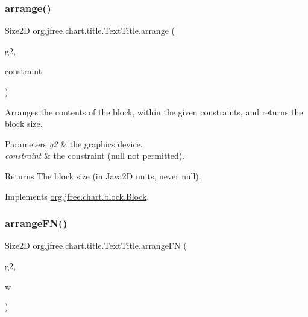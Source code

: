 \subsubsection{\texorpdfstring{arrange()}{arrange()}}
{\footnotesize\ttfamily Size2D org.\+jfree.\+chart.\+title.\+Text\+Title.\+arrange (\begin{DoxyParamCaption}\item[{Graphics2D}]{g2,  }\item[{\mbox{\hyperlink{classorg_1_1jfree_1_1chart_1_1block_1_1_rectangle_constraint}{Rectangle\+Constraint}}}]{constraint }\end{DoxyParamCaption})}

Arranges the contents of the block, within the given constraints, and returns the block size.


\begin{DoxyParams}{Parameters}
{\em g2} & the graphics device. \\
\hline
{\em constraint} & the constraint ({\ttfamily null} not permitted).\\
\hline
\end{DoxyParams}
\begin{DoxyReturn}{Returns}
The block size (in Java2D units, never {\ttfamily null}). 
\end{DoxyReturn}


Implements \mbox{\hyperlink{interfaceorg_1_1jfree_1_1chart_1_1block_1_1_block_ab4cabbc237c5277a4a0018bab930e5fe}{org.\+jfree.\+chart.\+block.\+Block}}.

\mbox{\label{classorg_1_1jfree_1_1chart_1_1title_1_1_text_title_a90b6dcb9d62b2211df78593831912eda}} 
\subsubsection{\texorpdfstring{arrange\+F\+N()}{arrangeFN()}}
{\footnotesize\ttfamily Size2D org.\+jfree.\+chart.\+title.\+Text\+Title.\+arrange\+FN (\begin{DoxyParamCaption}\item[{Graphics2D}]{g2,  }\item[{double}]{w }\end{DoxyParamCaption})\hspace{0.3cm}{\ttfamily [protected]}}

